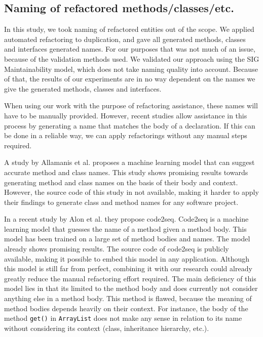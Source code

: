 \subsection{Naming of refactored methods/classes/etc.}
In this study, we took naming of refactored entities out of the scope. We applied automated refactoring to duplication, and gave all generated methods, classes and interfaces generated names. For our purposes that was not much of an issue, because of the validation methods used. We validated our approach using the SIG Maintainability model, which does not take naming quality into account. Because of that, the results of our experiments are in no way dependent on the names we give the generated methods, classes and interfaces.

When using our work with the purpose of refactoring assistance, these names will have to be manually provided. However, recent studies allow assistance in this process by generating a name that matches the body of a declaration. If this can be done in a reliable way, we can apply refactorings without any manual steps required.

A study by Allamanis et al. \cite{allamanis2015suggesting} proposes a machine learning model that can suggest accurate method and class names. This study shows promising results towards generating method and class names on the basis of their body and context. However, the source code of this study in not available, making it harder to apply their findings to generate class and method names for any software project.

In a recent study by Alon et al. \cite{alon2018code2seq} they propose code2seq. Code2seq is a machine learning model that guesses the name of a method given a method body. This model has been trained on a large set of method bodies and names. The model already shows promising results. The source code of code2seq is publicly available, making it possible to embed this model in any application. Although this model is still far from perfect, combining it with our research could already greatly reduce the manual refactoring effort required. The main deficiency of this model lies in that its limited to the method body and does currently not consider anything else in a method body. This method is flawed, because the meaning of method bodies depends heavily on their context. For instance, the body of the method \texttt{get()} in \texttt{ArrayList} does not make any sense in relation to its name without considering its context (class, inheritance hierarchy, etc.).

